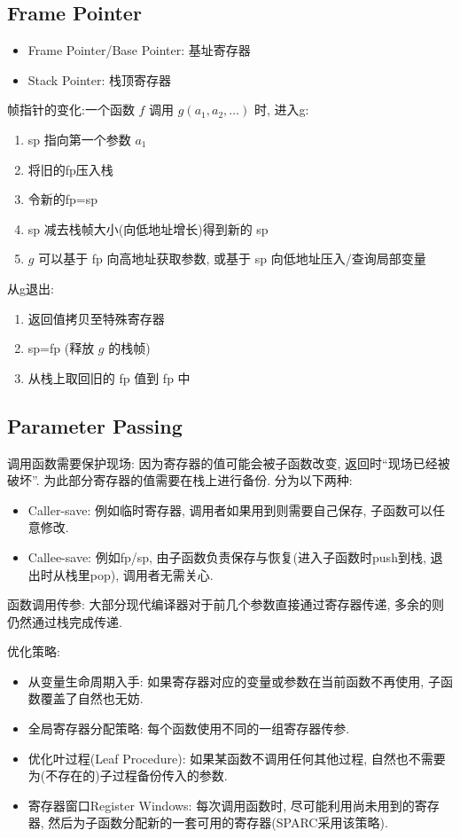 \subsection{Frame Pointer}
\begin{itemize}
    \item Frame Pointer/Base Pointer: 基址寄存器
    \item Stack Pointer: 栈顶寄存器
\end{itemize}

帧指针的变化:一个函数 $f$ 调用 $g(a_1,a_2,\dots)$ 时,
进入g:
\begin{enumerate}[start=1]
    \item sp 指向第一个参数 $a_1$
    \item 将旧的fp压入栈
    \item 令新的fp=sp
    \item sp 减去栈帧大小(向低地址增长)得到新的 sp
    \item $g$ 可以基于 fp 向高地址获取参数, 或基于 sp 向低地址压入/查询局部变量
\end{enumerate}
从g退出: 
\begin{enumerate}[start=6]
    \item 返回值拷贝至特殊寄存器
    \item sp=fp (释放 $g$ 的栈帧)
    \item 从栈上取回旧的 fp 值到 fp 中
\end{enumerate}

\subsection{Parameter Passing}
调用函数需要保护现场: 因为寄存器的值可能会被子函数改变, 返回时``现场已经被破坏''. 为此部分寄存器的值需要在栈上进行备份. 分为以下两种: 
\begin{itemize}
    \item Caller-save: 例如临时寄存器, 调用者如果用到则需要自己保存, 子函数可以任意修改.
    \item Callee-save: 例如fp/sp, 由子函数负责保存与恢复(进入子函数时push到栈, 退出时从栈里pop), 调用者无需关心.
\end{itemize}


函数调用传参: 大部分现代编译器对于前几个参数直接通过寄存器传递, 多余的则仍然通过栈完成传递.

优化策略:
\begin{itemize}
    \item 从变量生命周期入手: 如果寄存器对应的变量或参数在当前函数不再使用, 子函数覆盖了自然也无妨.
    \item 全局寄存器分配策略: 每个函数使用不同的一组寄存器传参.
    \item 优化叶过程(Leaf Procedure): 如果某函数不调用任何其他过程, 自然也不需要为(不存在的)子过程备份传入的参数.
    \item 寄存器窗口Register Windows: 每次调用函数时, 尽可能利用尚未用到的寄存器, 然后为子函数分配新的一套可用的寄存器(SPARC采用该策略).
\end{itemize}

